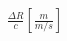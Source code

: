 \documentclass[preview]{standalone}
\begin{document}
\begin{align*}
\frac{\Delta R}{c} \left[ \frac{ m}{m/s} \right]
\end{align*}
\end{document}
